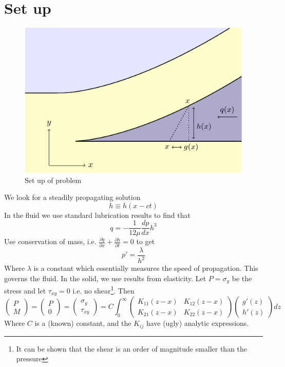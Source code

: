\documentclass{article}
\begin{document}
\section{Set up}
\begin{figure}[!ht]\centering
\caption{Set up of problem}
\includegraphics{Fig1.pdf}
\end{figure}
We look for a steadily propagating solution 
\[h \equiv h(x-ct)\]
In the fluid we use standard lubrication results to find that 
\[ q = - \frac{1}{12\mu}\frac{dp}{dx} h^3\] 
Use conservation of mass, i.e.
$\displaystyle \frac{\partial q}{\partial x} + 
\frac{\partial h}{\partial t} =0$ to get
\begin{equation}
p' = \frac{\lambda}{h^2}
\end{equation}
Where $\lambda$ is a constant which essentially measures the speed
of propagation.
This governs the fluid. In the solid, we use results from elasticity.
Let $P=\sigma_y$ be the stress and let $\tau_{xy} =0$ i.e. no shear\footnote{
It can be shown that the shear is an order of magnitude smaller than the pressure}.
Then
\[ \left( \begin{array}{c} P \\ M \end{array} \right) =
 \left( \begin{array}{c} P \\ 0 \end{array} \right) =
 \left( \begin{array}{c} \sigma_y \\ \tau_{xy} \end{array} \right) =
C \int_0^{\infty} \left(
\begin{array}{cc} K_{11}(z-x) & K_{12}(z-x) \\ K_{21}(z-x) & K_{22}(z-x) \end{array}
\right)
 \left( \begin{array}{c} g'(z) \\ h'(z) \end{array} \right) dz
\]
Where $C$ is a (known) constant, and the $K_{ij}$ have (ugly) analytic expressions.
\end{document}
